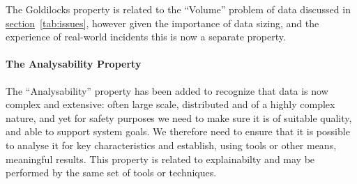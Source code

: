 The Goldilocks property is related to the ``Volume'' problem of data discussed in \hyperref[tab:issues]{section}~\ref{tab:issues}, however given the importance of data sizing, and the experience of real-world incidents this is now a separate property.
%
\paragraph{The Analysability Property}\label{bkm:guidance:analysability}
The ``Analysability'' property has been added to recognize that data is now complex and extensive: often large scale, distributed and of a highly complex nature, and yet for safety purposes we need to make sure it is of suitable quality, and able to support system goals.
We therefore need to ensure that it is possible to analyse it for key characteristics and establish, using tools or other means, meaningful results. This property is related to explainabilty and may be performed by the same set of tools or techniques.

